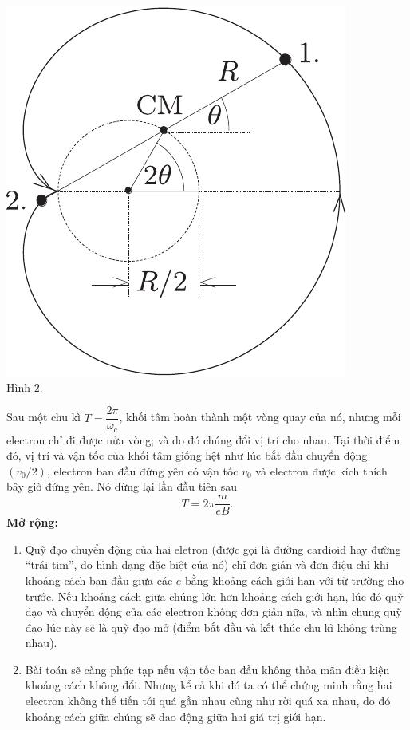 \begin{loigiai}
\begin{enumerate}[1)]
    \begin{center}
        \includegraphics[scale=0.75]{Anh/Nam4.pdf}\\
        Hình $2$.
    \end{center}
     Sau một chu kì $T = \dfrac{2\pi}{\omega_{\mathrm{c}}}$, khối tâm hoàn thành một vòng quay của nó, nhưng mỗi electron chỉ đi được nửa vòng; và do đó chúng đổi vị trí cho nhau. Tại thời điểm đó, vị trí và vận tốc của khối tâm giống hệt như lúc bắt đầu chuyển động $(v_0/2)$, electron ban đầu đứng yên có vận tốc $v_0$ và electron được kích thích bây giờ đứng yên. Nó dừng lại lần đầu tiên sau 
     \[T = 2\pi \dfrac{m}{eB}.\]
    \textbf{Mở rộng:}
    \begin{enumerate}[1)]
        \item Quỹ đạo chuyển động của hai eletron (được gọi là đường cardioid hay đường “trái tim”, do hình dạng đặc biệt của nó) chỉ đơn giản và đơn điệu chỉ khi khoảng cách ban đầu giữa các $e$ bằng khoảng cách giới hạn với từ trường cho trước. Nếu khoảng cách giữa chúng lớn hơn khoảng cách giới hạn, lúc đó quỹ đạo và chuyển động của các electron không đơn giản nữa, và nhìn chung quỹ đạo lúc này sẽ là quỹ đạo mở (điểm bắt đầu và kết thúc chu kì không trùng nhau).
        \item Bài toán sẽ càng phức tạp nếu vận tốc ban đầu không thỏa mãn điều kiện khoảng cách không đổi. Nhưng kể cả khi đó ta có thể chứng minh rằng hai electron không thể tiến tới quá gần nhau cũng như rời quá xa nhau, do đó khoảng cách giữa chúng sẽ dao động giữa hai giá trị giới hạn.
    \end{enumerate}
        
    \end{enumerate}
\end{loigiai}
